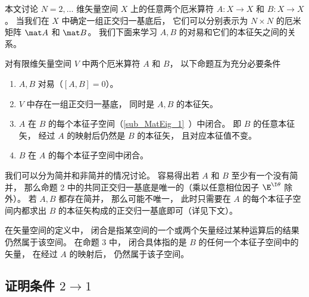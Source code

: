 

本文讨论 $N = 2, \dots$ 维矢量空间 $X$ 上的任意两个厄米算符 $A: X \to X$ 和 $B: X \to X$。 当我们在 $X$ 中确定一组正交归一基底后， 它们可以分别表示为 $N \times N$ 的厄米矩阵 $\mat A$ 和 $\mat B$。 我们下面来学习 $A, B$ 的对易和它们的本征矢之间的关系。

\begin{theorem}{}\label{the_Commut_1}
对有限维矢量空间 $V$ 中两个厄米算符 $A$ 和 $B$， 以下命题互为充分必要条件
\begin{enumerate}
\item $A,B$ 对易（$[A,B] = 0$）。
\item $V$ 中存在一组正交归一基底， 同时是 $A, B$ 的本征矢。
\item $A$ 在 $B$ 的每个本征子空间（\autoref{sub_MatEig_1}~）中闭合。 即 $B$ 的任意本征矢， 经过 $A$ 的映射后仍然是 $B$ 的本征矢， 且对应本征值不变。
\item $B$ 在 $A$ 的每个本征子空间中闭合。
\end{enumerate}
\end{theorem}

我们可以分为简并和非简并的情况讨论。 容易得出若 $A$ 和 $B$ 至少有一个没有简并， 那么命题 2 中的共同正交归一基底是唯一的（乘以任意相位因子 $\E^{\I\theta}$ 除外）。 若 $A,B$ 都存在简并， 那么可能不唯一， 此时只需要在 $A$ 的每个本征子空间内都求出 $B$ 的本征矢构成的正交归一基底即可（详见下文）。

在矢量空间的定义中， 闭合是指某空间的一个或两个矢量经过某种运算后的结果仍然属于该空间。 在命题 3 中， 闭合具体指的是 $B$ 的任何一个本征子空间中的矢量， 在经过 $A$ 的映射后， 仍然属于该子空间。

\subsection{证明条件 $2 \to 1$}

